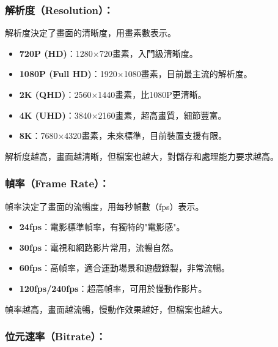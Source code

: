


\subsubsection*{解析度（Resolution）：}

解析度決定了畫面的清晰度，用畫素數表示。

\begin{itemize}
  \item \textbf{720P (HD)}：1280×720畫素，入門級清晰度。
  \item \textbf{1080P (Full HD)}：1920×1080畫素，目前最主流的解析度。
  \item \textbf{2K (QHD)}：2560×1440畫素，比1080P更清晰。
  \item \textbf{4K (UHD)}：3840×2160畫素，超高畫質，細節豐富。
  \item \textbf{8K}：7680×4320畫素，未來標準，目前裝置支援有限。
\end{itemize}

解析度越高，畫面越清晰，但檔案也越大，對儲存和處理能力要求越高。

\subsubsection*{幀率（Frame Rate）：}

幀率決定了畫面的流暢度，用每秒幀數（fps）表示。

\begin{itemize}
  \item \textbf{24fps}：電影標準幀率，有獨特的"電影感"。
  \item \textbf{30fps}：電視和網路影片常用，流暢自然。
  \item \textbf{60fps}：高幀率，適合運動場景和遊戲錄製，非常流暢。
  \item \textbf{120fps/240fps}：超高幀率，可用於慢動作影片。
\end{itemize}

幀率越高，畫面越流暢，慢動作效果越好，但檔案也越大。

\subsubsection*{位元速率（Bitrate）：}

